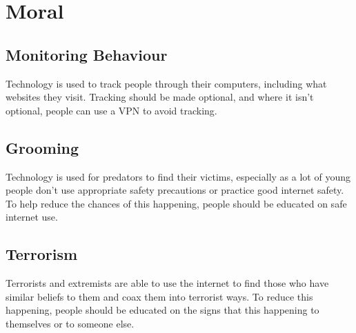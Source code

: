 \documentclass[a4paper,11pt, twocolumn]{article}
\begin{document}
\section{Moral}
\subsection{Monitoring Behaviour}
Technology is used to track people through their computers, including what websites they visit. Tracking should be made optional, and where it isn't optional, people can use a VPN to avoid tracking. 
\subsection{Grooming}
Technology is used for predators to find their victims, especially as a lot of young people don't use appropriate safety precautions or practice good internet safety. To help reduce the chances of this happening, people should be educated on safe internet use.
\subsection{Terrorism}
Terrorists and extremists are able to use the internet to find those who have similar beliefs to them and coax them into terrorist ways. To reduce this happening, people should be educated on the signs that this happening to themselves or to someone else.
\end{document}
